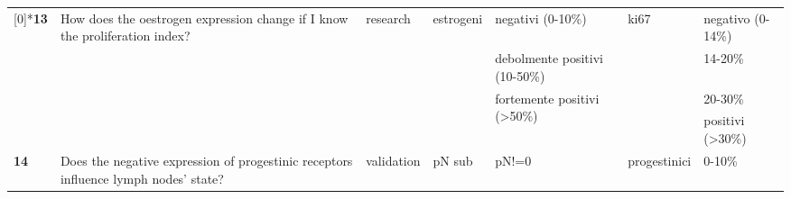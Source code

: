 \begin{sidewaystable*}[h]
\begin{tabularx}{\textwidth}{lXllllX}
	      \addlinespace[1ex]
		\multirow{4}[0]{*}{\textbf{13}} & \multirow{4}[0]{4cm}{How does the oestrogen expression change if I know the proliferation index?} & \multirow{4}[0]{*}{research} & \multirow{4}[0]{*}{estrogeni} &  negativi (0-10\%) & \multirow{4}[0]{*}{ki67} & negativo (0-14\%) \\
		      &       &       &       &  debolmente positivi (10-50\%) &       & 14-20\% \\
		      &       &       &       & \multirow{2}[0]{*}{fortemente positivi (>50\%)} &       & 20-30\% \\
		      &       &       &       &       &       & positivi (>30\%) \\
      \addlinespace[1ex]
	      \textbf{14} & Does the negative expression of progestinic receptors influence lymph nodes' state? & validation & pN sub & pN!=0  & progestinici & 0-10\% \\
      \end{tabularx}
	\label{ann:conditionalprobability2}
\end{sidewaystable*}

